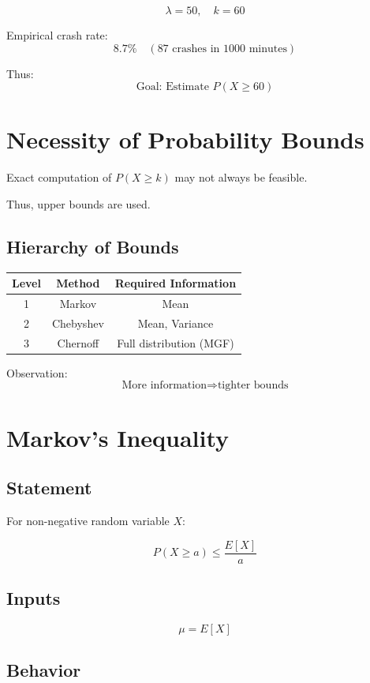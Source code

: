 \documentclass[11pt]{article}
\begin{document}
\[
\lambda = 50,\quad k = 60
\]

Empirical crash rate:
\[
8.7\% \quad (\text{87 crashes in 1000 minutes})
\]

Thus:
\[
\text{Goal: Estimate } P(X \ge 60)
\]

\section{Necessity of Probability Bounds}

Exact computation of $P(X \ge k)$ may not always be feasible.

Thus, upper bounds are used.

\subsection*{Hierarchy of Bounds}

\begin{center}
\begin{tabular}{c|c|c}
Level & Method & Required Information \\ \hline
1 & Markov & Mean \\
2 & Chebyshev & Mean, Variance \\
3 & Chernoff & Full distribution (MGF)
\end{tabular}
\end{center}

Observation:
\[
\text{More information} \Rightarrow \text{tighter bounds}
\]

\section{Markov’s Inequality}

\subsection{Statement}

For non-negative random variable $X$:

\[
P(X \ge a) \le \frac{E[X]}{a}
\]

\subsection{Inputs}

\[
\mu = E[X]
\]

\subsection{Behavior}
\end{document}
